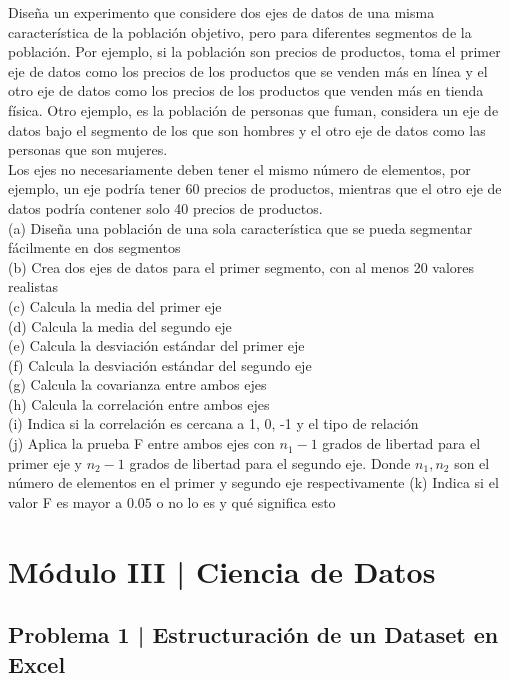 \documentclass{article}
\begin{document}
Diseña un experimento que considere dos ejes de datos de una misma característica de la población objetivo, pero para diferentes segmentos de la población. Por ejemplo, si la población son precios de productos, toma el primer eje de datos como los precios de los productos que se venden más en línea y el otro eje de datos como los precios de los productos que venden más en tienda física. Otro ejemplo, es la población de personas que fuman, considera un eje de datos bajo el segmento de los que son hombres y el otro eje de datos como las personas que son mujeres.
\\[12pt]
Los ejes no necesariamente deben tener el mismo número de elementos, por ejemplo, un eje podría tener 60 precios de productos, mientras que el otro eje de datos podría contener solo 40 precios de productos.
\\[12pt]
(a) Diseña una población de una sola característica que se pueda segmentar fácilmente en dos segmentos
\\[6pt]
(b) Crea dos ejes de datos para el primer segmento, con al menos 20 valores realistas
\\[6pt]
(c) Calcula la media del primer eje
\\[6pt]
(d) Calcula la media del segundo eje
\\[6pt]
(e) Calcula la desviación estándar del primer eje
\\[6pt]
(f) Calcula la desviación estándar del segundo eje
\\[6pt]
(g) Calcula la covarianza entre ambos ejes
\\[6pt]
(h) Calcula la correlación entre ambos ejes
\\[6pt]
(i) Indica si la correlación es cercana a 1, 0, -1 y el tipo de relación
\\[6pt]
(j) Aplica la prueba F entre ambos ejes con $n_1-1$ grados de libertad para el primer eje y $n_2-1$ grados de libertad para el segundo eje. Donde $n_1, n_2$ son el número de elementos en el primer y segundo eje respectivamente
(k) Indica si el valor F es mayor a $0.05$ o no lo es y qué significa esto

\clearpage

\section*{Módulo III | Ciencia de Datos}

\subsection*{Problema 1 | Estructuración de un Dataset en Excel}
\end{document}
